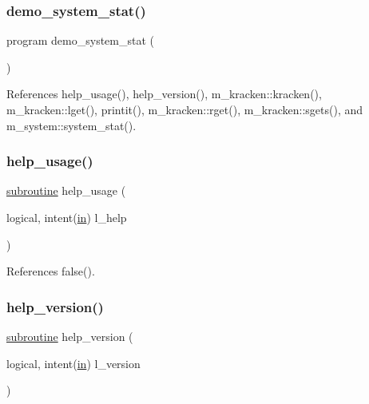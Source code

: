\subsubsection{\texorpdfstring{demo\+\_\+system\+\_\+stat()}{demo\_system\_stat()}}
{\footnotesize\ttfamily program demo\+\_\+system\+\_\+stat (\begin{DoxyParamCaption}{ }\end{DoxyParamCaption})}



References help\+\_\+usage(), help\+\_\+version(), m\+\_\+kracken\+::kracken(), m\+\_\+kracken\+::lget(), printit(), m\+\_\+kracken\+::rget(), m\+\_\+kracken\+::sgets(), and m\+\_\+system\+::system\+\_\+stat().

\mbox{\label{__stat_8f90_a3e09a3b52ee8fb04eeb93fe5761626a8}} 
\subsubsection{\texorpdfstring{help\+\_\+usage()}{help\_usage()}}
{\footnotesize\ttfamily \hyperlink{M__stopwatch_83_8txt_acfbcff50169d691ff02d4a123ed70482}{subroutine} help\+\_\+usage (\begin{DoxyParamCaption}\item[{logical, intent(\hyperlink{M__journal_83_8txt_afce72651d1eed785a2132bee863b2f38}{in})}]{l\+\_\+help }\end{DoxyParamCaption})}



References false().

\mbox{\label{__stat_8f90_a39c21619b08a3c22f19e2306efd7f766}} 
\subsubsection{\texorpdfstring{help\+\_\+version()}{help\_version()}}
{\footnotesize\ttfamily \hyperlink{M__stopwatch_83_8txt_acfbcff50169d691ff02d4a123ed70482}{subroutine} help\+\_\+version (\begin{DoxyParamCaption}\item[{logical, intent(\hyperlink{M__journal_83_8txt_afce72651d1eed785a2132bee863b2f38}{in})}]{l\+\_\+version }\end{DoxyParamCaption})}



